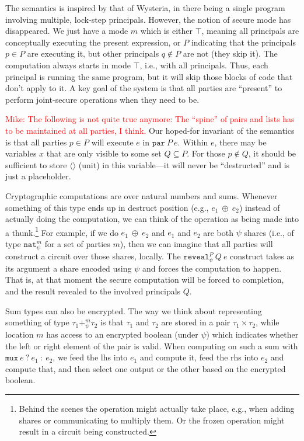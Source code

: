 \documentclass[10pt]{article}
\newcommand{\kw}[1]{\ensuremath{\mathtt{#1}}}
\newcommand{\tnat}{\ensuremath{\mathtt{nat}}}
\newcommand{\tprod}[2]{\ensuremath{{#1} \times {#2}}}
\newcommand{\tsum}[4]{\ensuremath{{#1} +^{#3}_{#4} {#2}}}
\newcommand{\ebinop}[2]{\ensuremath{{#1}~\oplus~{#2}}}
\newcommand{\epar}[2]{\ensuremath{\kw{par}~{#1}~{#2}}}
\newcommand{\ereveal}[4]{\ensuremath{\kw{reveal}^{#1}_{#4}~{#2}~{#3}}}
\newcommand{\emux}[3]{\ensuremath{\kw{mux}~{#1}~\kw{?}~{#2}~\kw{:}~{#3}}}
\newcommand{\mwh}[1]{\textcolor{red}{Mike: #1}}
\begin{document}
\begin{figure}
\end{figure}

The semantics is inspired by that of Wysteria, in there being a single
program involving multiple, lock-step principals. However, the notion
of secure mode has disappeared. We just have a mode $m$ which is
either $\top$, meaning all principals are conceptually executing the
present expression, or $P$ indicating that the principals
$p \in P$ are executing it, but other principals $q \not\in P$ are not
(they skip it). The computation always starts in mode $\top$, i.e.,
with all principals. Thus, each principal is running the same program,
but it will skip those blocks of code that don't apply to it.  A key
goal of the system is that all parties are ``present'' to perform
joint-secure operations when they need to be.

\mwh{The following is not quite true anymore: The ``spine'' of pairs
  and lists has to be maintained at all parties, I think.}
Our hoped-for invariant of the semantics is that all parties $p \in P$
will execute $e$ in $\epar{P}{e}$. Within $e$, there may be variables
$x$ that are only visible to some set $Q \subseteq P$. For those
$p \not\in Q$, it should be sufficient to store $\langle \rangle$
(unit) in this variable---it will never be ``destructed'' and is just
a placeholder.

Cryptographic computations are over natural numbers and sums. Whenever
something of this type ends up in destruct position (e.g.,
$\ebinop{e_1}{e_2}$) instead of actually doing the computation, we can
think of the operation as being made into a thunk.\footnote{Behind the
  scenes the operation might actually take place, e.g., when adding
  shares or communicating to multiply them. Or the frozen operation
  might result in a circuit being constructed.} For example, if we do
$\ebinop{e_1}{e_2}$ and $e_1$ and $e_2$ are both $\psi$ shares (i.e.,
of type $\tnat^m_\psi$ for a set of parties $m$), then we can imagine
that all parties will construct a circuit over those shares,
locally. The $\ereveal{P}{Q}{e}{\psi}$ construct takes as its argument
a share encoded using $\psi$ and forces the computation to
happen. That is, at that moment the secure computation will be forced
to completion, and the result revealed to the involved principals $Q$.

Sum types can also be encrypted. The way we think about representing
something of type $\tsum{\tau_1}{\tau_2}{m}{\psi}$ is that $\tau_1$
and $\tau_2$ are stored in a pair $\tprod{\tau_1}{\tau_2}$, while
location $m$ has access to an encrypted boolean (under $\psi$) which
indicates whether the left or right element of the pair is valid. When
computing on such a sum with $\emux{e}{e_1}{e_2}$, we feed the lhs
into $e_1$ and compute it, feed the rhs into $e_2$ and compute that,
and then select one output or the other based on the encrypted
boolean.
\end{document}
